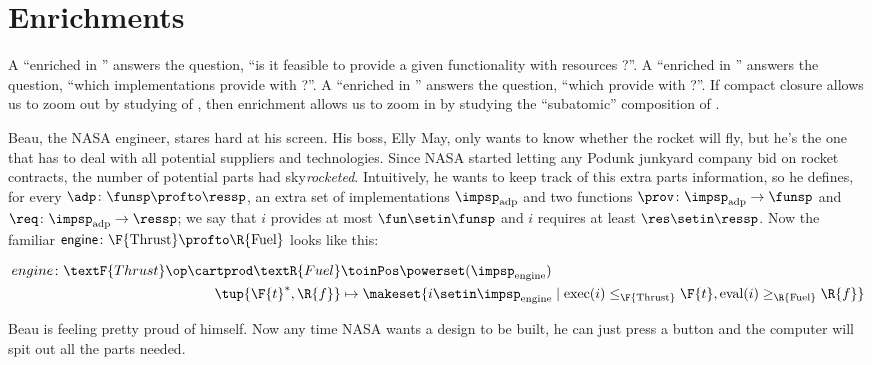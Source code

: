 
\section{Enrichments}
\label{sec:enriched}


A  ``enriched in \Bool'' answers the question, ``is it feasible to provide a given functionality \fun with resources \res?''.
A  ``enriched in \Set'' answers the question, ``which implementations provide \fun with \res?''.
A  ``enriched in \DP'' answers the question, ``which  provide \fun with \res?''.
If compact closure allows us to zoom out by studying  of , then enrichment allows us to zoom in by studying the ``subatomic'' composition of .

\begin{example}
    \label{ex:dpi_example}
    Beau, the NASA engineer, stares hard at his screen.
    His boss, Elly May, only wants to know whether the rocket will fly, but he's the one that has to deal with all potential suppliers and technologies.
    Since NASA started letting any Podunk junkyard company bid on rocket contracts, the number of potential parts had sky\emph{rocketed}.
    Intuitively, he wants to keep track of this extra parts information, so he defines, for every  $\adp \colon \funsp \profto \ressp$, an extra set of implementations $\impsp_\text{adp}$ and two functions $\prov\colon \impsp_\text{adp} \to \funsp$ and $\req\colon \impsp_\text{adp} \to \ressp$; we say that $i$ provides at most $\fun \setin \funsp$ and $i$ requires at least $\res \setin \ressp$.
    Now the familiar $\mathsf{engine} \colon \F{\text{Thrust}} \profto \R{\text{Fuel}}$  looks like this:
    \begin{widepar}
        \begin{equation}
            \begin{aligned}
                engine \colon \textF{Thrust}\op \cartprod \textR{Fuel} & \toinPos \powerset(\impsp_\text{engine}) \\
                \tup{\F{t}^*,\R{f}}                                    & \mapsto \makeset{ i \setin \impsp_\text{engine} \mid \text{exec}(i) \leq_\F{\text{Thrust}} \F{t}, \text{eval}(i) \geq_\R{\text{Fuel}} \R{f} }
            \end{aligned}
        \end{equation}
    \end{widepar}
    Beau is feeling pretty proud of himself.
    Now any time NASA wants a design to be built, he can just press a button and the computer will spit out all the parts needed.
\end{example}

